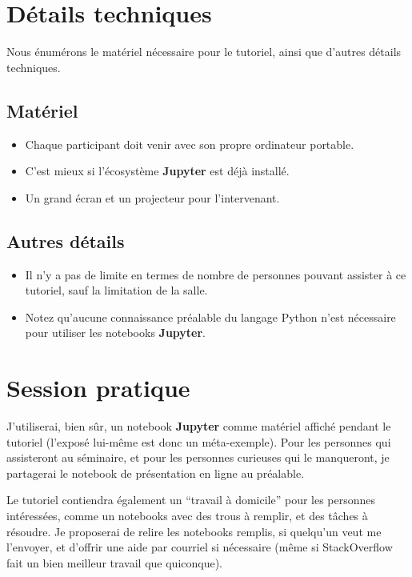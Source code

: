 \documentclass[runningheads]{llncs}
\newcommand{\Jupyter}{\textbf{Jupyter}}
\begin{document}
\section{Détails techniques}

Nous énumérons le matériel nécessaire pour le tutoriel, ainsi que d'autres détails techniques.

\subsection*{Matériel}

\begin{itemize}
    \item Chaque participant doit venir avec son propre ordinateur portable.
    \item C'est mieux si l'écosystème \Jupyter{} est déjà installé.
    \item Un grand écran et un projecteur pour l'intervenant.
\end{itemize}


\subsection*{Autres détails}

\begin{itemize}
    \item Il n'y a pas de limite en termes de nombre de personnes pouvant assister à ce tutoriel, sauf la limitation de la salle.
    \item Notez qu'aucune connaissance préalable du langage Python n'est nécessaire pour utiliser les notebooks \Jupyter.
\end{itemize}



\section{Session pratique}

J'utiliserai, bien sûr, un notebook \Jupyter{} comme matériel affiché pendant le tutoriel (l'exposé lui-même est donc un méta-exemple).
Pour les personnes qui assisteront au séminaire, et pour les personnes curieuses qui le manqueront, je partagerai le notebook de présentation en ligne au préalable.

Le tutoriel contiendra également un ``travail à domicile'' pour les personnes intéressées, comme un notebooks avec des trous à remplir, et des tâches à résoudre.
Je proposerai de relire les notebooks remplis, si quelqu'un veut me l'envoyer, et d'offrir une aide par courriel si nécessaire (même si StackOverflow fait un bien meilleur travail que quiconque).
\end{document}
